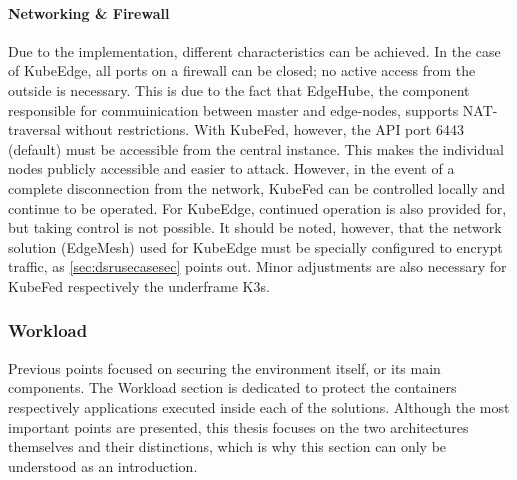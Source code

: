 \documentclass[MIC,Master,english]{twbook}%
\begin{document}
\paragraph{Networking \& Firewall} Due to the implementation, different characteristics can be achieved. In the case of KubeEdge, all ports on a firewall can be closed; no active access from the outside is necessary. This is due to the fact that EdgeHube, the component responsible for commuinication between master and edge-nodes, supports \ac{NAT}-traversal without restrictions.
With KubeFed, however, the API port 6443 (default) must be accessible from the central instance. This makes the individual nodes publicly accessible and easier to attack. However, in the event of a complete disconnection from the network, KubeFed can be controlled locally and continue to be operated. For KubeEdge, continued operation is also provided for, but taking control is not possible. It should be noted, however, that the network solution (EdgeMesh) used for KubeEdge must be specially configured to encrypt traffic, as \autoref{sec:dsrusecasesec} points out. Minor adjustments are also necessary for KubeFed respectively the underframe K3s.

\subsubsection{Workload} Previous points focused on securing the environment itself, or its main components. The Workload section is dedicated to protect the containers respectively applications executed inside each of the solutions. Although the most important points are presented, this thesis focuses on the two architectures themselves and their distinctions, which is why this section can only be understood as an introduction.
\end{document}
